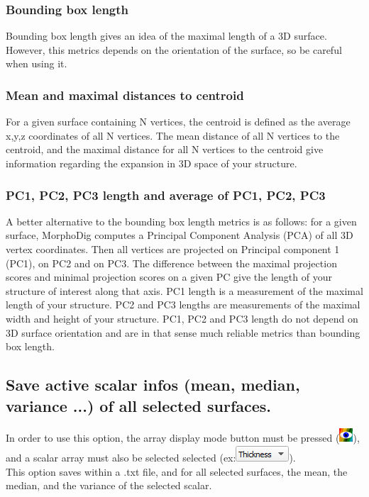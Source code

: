 \subsubsection{Bounding box length}
Bounding box length gives an idea of the maximal length of a 3D surface. However, this metrics depends on the orientation of the surface, so be careful when using it.

\subsubsection{Mean and maximal distances to centroid}
For a given surface containing N vertices, the centroid is defined as the average x,y,z coordinates of all N vertices. The mean distance of all N vertices to the centroid, and the maximal distance for all N vertices to the centroid give information regarding the expansion in 3D space of your structure.
\subsubsection{PC1, PC2, PC3 length and average of PC1, PC2, PC3}
A better alternative to the bounding box length metrics is as follows: for a given surface, MorphoDig computes a Principal Component Analysis (PCA) of all 3D vertex coordinates. Then all vertices are projected on Principal component 1 (PC1), on PC2 and on PC3. The difference between the maximal projection scores and minimal projection scores on a given PC give the length of your structure of interest along that axis. PC1 length is a measurement of the maximal length of your structure. PC2 and PC3 lengths are measurements of the maximal width and height of your structure. PC1, PC2 and PC3 length do not depend on 3D surface orientation and are in that sense much reliable metrics than bounding box length. 

\subsection{Save active scalar infos (mean, median, variance ...) of all selected surfaces.}
In order to use this option, the array display mode button must be pressed (\includegraphics[scale=0.7]{images/04/show_color_scale.png}), and a scalar array must also be selected selected (ex:\includegraphics[scale=0.5]{images/04/scalarcombo_scalar.png}).\\
This option saves within a .txt file, and for all selected surfaces, the mean, the median, and the variance of the selected scalar.

